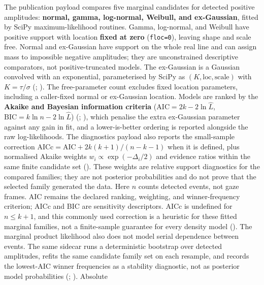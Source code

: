\documentclass[
]{article}
\begin{document}
The publication payload compares five marginal candidates for detected
positive amplitudes: \textbf{normal, gamma, log-normal, Weibull, and
ex-Gaussian}, fitted by SciPy maximum-likelihood routines. Gamma,
log-normal, and Weibull have positive support with location
\textbf{fixed at zero} (\texttt{floc=0}), leaving shape and scale free.
Normal and ex-Gaussian have support on the whole real line and can
assign mass to impossible negative amplitudes; they are unconstrained
descriptive comparators, not positive-truncated models. The ex-Gaussian
is a Gaussian convolved with an exponential, parameterised by SciPy as
\((K,\mathrm{loc},\mathrm{scale})\) with \(K=\tau/\sigma\)
(;
). The free-parameter count
excludes fixed location parameters, including a caller-fixed normal or
ex-Gaussian location. Models are ranked by the \textbf{Akaike and
Bayesian information criteria} (\(\mathrm{AIC} = 2k - 2\ln\hat{L}\),
\(\mathrm{BIC} = k\ln n - 2\ln\hat{L}\))
(;
), which penalise the
extra ex-Gaussian parameter against any gain in fit, and a
lower-is-better ordering is reported alongside the raw log-likelihoods.
The diagnostics payload also reports the small-sample correction
\(\mathrm{AICc} = \mathrm{AIC} + 2k(k+1)/(n-k-1)\) when it is defined,
plus normalised Akaike weights \(w_i \propto \exp(-\Delta_i/2)\) and
evidence ratios within the same finite candidate set
(). These
weights are relative support diagnostics for the compared families; they
are not posterior probabilities and do not prove that the selected
family generated the data. Here \(n\) counts detected events, not gaze
frames. AIC remains the declared ranking, weighting, and
winner-frequency criterion; AICc and BIC are sensitivity descriptors.
AICc is undefined for \(n\leq k+1\), and this commonly used correction
is a heuristic for these fitted marginal families, not a finite-sample
guarantee for every density model
(). The
marginal product likelihood also does not model serial dependence
between events. The same sidecar runs a deterministic bootstrap over
detected amplitudes, refits the same candidate family set on each
resample, and records the lowest-AIC winner frequencies as a stability
diagnostic, not as posterior model probabilities
(;
). Absolute
\end{document}
